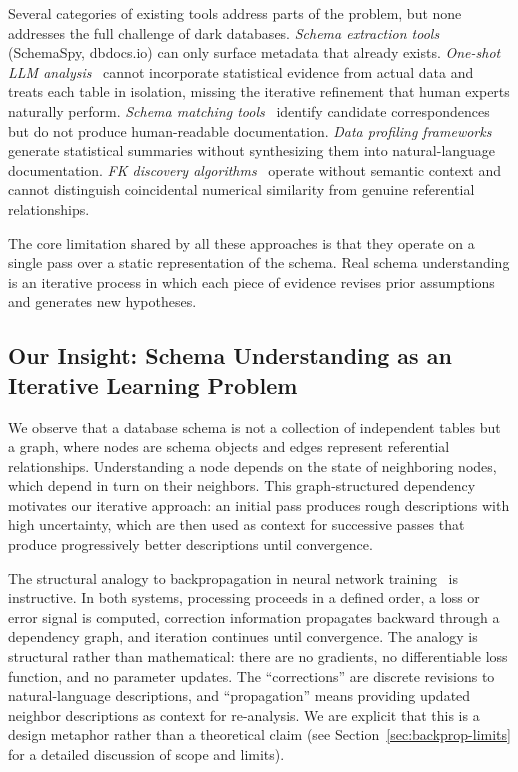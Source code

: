 \documentclass[sigconf, nonacm]{acmart}
\begin{document}
Several categories of existing tools address parts of the problem, but none addresses the full challenge of dark databases. \emph{Schema extraction tools} (SchemaSpy, dbdocs.io) can only surface metadata that already exists. \emph{One-shot LLM analysis}~\cite{trummer2024succinct} cannot incorporate statistical evidence from actual data and treats each table in isolation, missing the iterative refinement that human experts naturally perform. \emph{Schema matching tools}~\cite{rahm2001survey} identify candidate correspondences but do not produce human-readable documentation. \emph{Data profiling frameworks}~\cite{abedjan2015profiling} generate statistical summaries without synthesizing them into natural-language documentation. \emph{FK discovery algorithms}~\cite{rostin2009fk,jiang2020holistic} operate without semantic context and cannot distinguish coincidental numerical similarity from genuine referential relationships.

The core limitation shared by all these approaches is that they operate on a single pass over a static representation of the schema. Real schema understanding is an iterative process in which each piece of evidence revises prior assumptions and generates new hypotheses.

\subsection{Our Insight: Schema Understanding as an Iterative Learning Problem}

We observe that a database schema is not a collection of independent tables but a graph, where nodes are schema objects and edges represent referential relationships. Understanding a node depends on the state of neighboring nodes, which depend in turn on their neighbors. This graph-structured dependency motivates our iterative approach: an initial pass produces rough descriptions with high uncertainty, which are then used as context for successive passes that produce progressively better descriptions until convergence.

The structural analogy to backpropagation in neural network training~\cite{rumelhart1986backprop} is instructive. In both systems, processing proceeds in a defined order, a loss or error signal is computed, correction information propagates backward through a dependency graph, and iteration continues until convergence. The analogy is structural rather than mathematical: there are no gradients, no differentiable loss function, and no parameter updates. The ``corrections'' are discrete revisions to natural-language descriptions, and ``propagation'' means providing updated neighbor descriptions as context for re-analysis. We are explicit that this is a design metaphor rather than a theoretical claim (see Section~\ref{sec:backprop-limits} for a detailed discussion of scope and limits).
\end{document}
